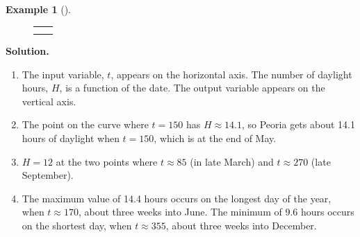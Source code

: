 \documentclass[10pt,]{book}
\theoremstyle{plain}
\theoremstyle{definition}
\theoremstyle{definition}
\newtheorem{example}[theorem]{Example}
\theoremstyle{definition}
\newlength{\panelmax}
\begin{document}
\begin{example}[]
{{}
\newlength{\phAimage}\setlength{\phAimage}{\ht\panelboxAimage+\dp\panelboxAimage}
\settototalheight{\phAimage}{\usebox{\panelboxAimage}}
\setlength{\panelmax}{\maxof{\panelmax}{\phAimage}}
\leavevmode%
\setlength{\tabcolsep}{0\textwidth}
\begin{figure}
\begin{tabular}{@{}*{2}{c}@{}}
\begin{minipage}[c][\panelmax][t]{0.5\textwidth}\usebox{\panelboxAparagraphs}\end{minipage}&
\begin{minipage}[c][\panelmax][t]{0.5\textwidth}\usebox{\panelboxAimage}\end{minipage}\tabularnewline
&
\parbox[t]{0.5\textwidth}{
}\end{tabular}
\end{figure}
}%
\par\medskip\noindent%
\textbf{Solution.}\quad \leavevmode%
\begin{enumerate}[label=\alph*]
\item\hypertarget{li-19}{}The input variable, \(t\), appears on the horizontal axis. The number of daylight hours, \(H\), is a function of the date. The output variable appears on the vertical axis.%
\item\hypertarget{li-20}{}The point on the curve where \(t = 150\) has \(H \approx 14.1\), so Peoria gets about 14.1 hours of daylight when \(t = 150\), which is at the end of May.%
\item\hypertarget{li-21}{}\(H = 12\) at the two points where \(t \approx 85\) (in late March) and \(t \approx 270\) (late September).%
\item\hypertarget{li-22}{}The maximum value of 14.4 hours occurs on the longest day of the year, when \(t \approx 170\), about three weeks into June. The minimum of 9.6 hours occurs on the shortest day, when \(t \approx 355\), about three weeks into December.%
\end{enumerate}
\end{example}
\end{document}
